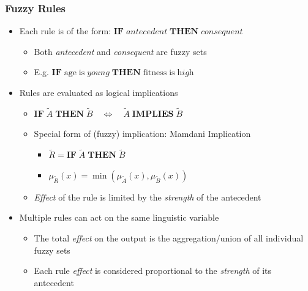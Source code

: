 \documentclass[
	10pt,
	t		%
]{beamer}
\begin{document}
\begin{frame}
	\frametitle{Fuzzy Rules}
	\begin{itemize}
		\item Each rule is of the form: $\textbf{IF} \; {antecedent} \; \textbf{THEN} \; {consequent}$
		      \begin{itemize}
			      \item Both \textit{antecedent} and \textit{consequent} are fuzzy sets
			      \item E.g. $\textbf{IF} \; \text{age} \; \text{is} \; \textit{young} \; \textbf{THEN} \; \text{fitness} \; \text{is} \; \textit{high}$
		      \end{itemize}
		\item Rules are evaluated as logical implications
		      \begin{itemize}
			      \item $\textbf{IF} \; \tilde{A} \; \textbf{THEN} \; \tilde{B} \quad \iff \quad \tilde{A} \;  \textbf{IMPLIES} \;  \tilde{B}$
			      \item Special form of (fuzzy) implication: Mamdani Implication
			            \begin{itemize}
				            \item $\tilde{R} = \textbf{IF} \; \tilde{A} \; \textbf{THEN} \; \tilde{B}$
				            \item $\mu_{\tilde{R}}(x) = \min(\mu_{\tilde{A}}(x), \mu_{\tilde{B}}(x))$
			            \end{itemize}
			      \item \textit{Effect} of the rule is limited by the \textit{strength} of the antecedent
		      \end{itemize}
		\item Multiple rules can act on the same linguistic variable
		      \begin{itemize}
			      \item The total \textit{effect} on the output is the aggregation/union of all individual fuzzy sets
			      \item Each rule \textit{effect} is considered proportional to the \textit{strength} of its antecedent
		      \end{itemize}
	\end{itemize}
\end{frame}
\end{document}
